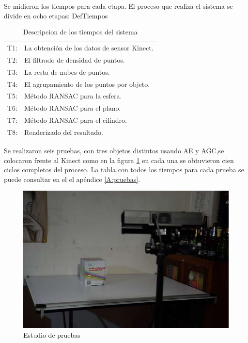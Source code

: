 	Se midieron los tiempos para cada etapa. El proceso que realiza el sistema se divide en ocho etapas:
	DefTiempos
	
	\begin{table}[h]
		\caption{Descripcion de los tiempos del sistema}
		\centering
		\begin{tabular}{ll}
		\hline
		 T1:& La obtención de los datos de sensor Kinect.\\
		 T2:& El filtrado de densidad de puntos.\\
		 T3:& La resta de nubes de puntos.\\
		 T4:& El agrupamiento de los puntos por objeto.\\
		 T5:& Método RANSAC para la esfera.\\
		 T6:& Método RANSAC para el plano.\\
		 T7:& Método RANSAC para el cilindro.\\
		 T8:& Renderizado del resultado.\\
		
		\hline
	\end{tabular}
\label{tab:DefTiempos}
\end{table}
	
	Se realizaron seis pruebas, con tres objetos distintos usando AE y AGC,se colocaron frente al Kinect como en la figura \ref{fig:casoDeESt} en cada una se obtuvieron cien ciclos completos del proceso. La tabla con todos los tiempos para cada prueba se puede consultar en el el apéndice \ref{A:pruebas}.
	
	\begin{figure} [H]
		\centering
		\includegraphics[width=1\textwidth]{03Resultados/imagenes/casoDeEstudio.JPG}
		\caption{Estudio de pruebas} 
		\label{fig:casoDeESt}
	\end{figure}

